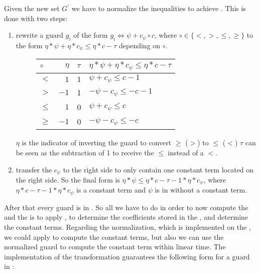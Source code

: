 \begin{enumerate}
		Given the new set $G^\prime$ we have to normalize the inequalities to achieve \strG. This is done with two steps:
		\begin{enumerate}
			\item rewrite a guard $g_i$ of the form $g_i \Leftrightarrow \psi + c_{\psi} \circ c$, where $\circ \in \{<,>,\le,\ge\}$ to the form $ \eta*\psi + \eta*c_{\psi} \le \eta*c-\tau$ depending on $\circ$.\newline
			\begin{figure}[H]
				\centering
				\begin{tabular}{|l|r|l|l|}
					\hline
					$\circ$ 	& $\eta$ 	& $\tau$ 	&  $ \eta*\psi + \eta*c_{\psi} \le \eta*c-\tau$ \\ 
					\hline \hline
					$<$ 		& $1$ 		&  $1$ 		& $\psi + c_{\psi} \le c - 1$ \\ \hline
					$>$ 		& $-1$		&  1 		& $-\psi - c_{\psi} \le -c -1 $ \\ \hline
					$\le$ 		& $1$ 		&  0 		& $\psi + c_{\psi} \le c$ \\ \hline
					$\ge$ 		& $-1$ 		&  0 		& $-\psi - c_{\psi} \le -c$ \\ \hline
				\end{tabular}
			\end{figure}
			$\eta$ is the indicator of inverting the guard to convert $\ge$ ($>$) to $\le$ ($<$)\newline
			$\tau$ can be seen as the subtraction of 1 to receive the $\le$ instead of a $<$.
			\item transfer the $c_{\psi}$ to the right side to only contain one constant term located on the right side. So the final form is $\eta*\psi \le \eta*c -\tau -1*\eta*c_{\psi}$, where $\eta*c -\tau -1*\eta*c_{\psi}$ is a constant term and $\psi$ is in \stdLinInt without a constant term.
		\end{enumerate}
\end{enumerate}
 After that every guard is in \strG. So all we have to do in order to now compute the \guardmatrix and the \guardconstants is to apply , to determine the coefficients stored in the \guardmatrix, and determine the constant terms. \newline
 Regarding the normalization, which is implemented on the \rpntree, we could apply  to compute the constant terms, but also we can use the normalized guard to compute the constant term within linear time. The implementation of the transformation guarantees the following form for a guard in \strG:
 
